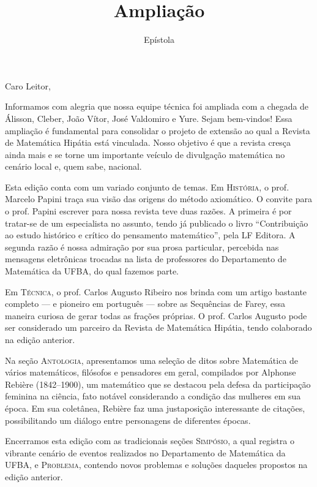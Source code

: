 \documentclass[onecolumn]{hipatia}
\title{Ampliação}
\subtitle{Epístola}
\author{}
\begin{document}
\setcounter{page}{\epistolapage}
\maketitle
\leftskip=2.5cm
\rightskip=2.5cm


\noindent Caro Leitor,
\vspace{1cm}


Informamos com alegria que nossa equipe técnica foi ampliada com a chegada de Álisson, Cleber, João Vítor, José Valdomiro e Yure. Sejam bem-vindos! Essa ampliação é fundamental para consolidar o projeto de extensão ao qual a Revista de Matemática Hipátia está vinculada. Nosso objetivo é que a revista cresça ainda mais e se torne um importante veículo de divulgação matemática no cenário local e, quem sabe, nacional.

Esta edição conta com um variado conjunto de temas. Em \textsc{História}, o prof. Marcelo Papini traça sua visão das origens do método axiomático. O convite para 
o prof. Papini escrever para nossa revista teve duas razões. A primeira é por
tratar-se de um especialista no assunto, tendo já publicado o livro ``Contribuição ao estudo histórico e crítico do pensamento matemático'', pela LF Editora.
A segunda razão é nossa admiração por sua prosa particular, 
percebida nas mensagens eletrônicas trocadas na lista de professores do Departamento
de Matemática da UFBA, do qual fazemos parte. 

Em \textsc{Técnica}, o prof. Carlos Augusto Ribeiro nos brinda com um 
artigo bastante completo --- e pioneiro em português --- sobre as Sequências de Farey, essa maneira 
curiosa de gerar todas as frações próprias. O prof. Carlos Augusto 
pode ser considerado um parceiro da Revista de Matemática Hipátia, tendo colaborado na edição anterior.

Na seção \textsc{Antologia}, apresentamos uma seleção de ditos 
sobre Matemática de vários matemáticos, filósofos e pensadores em geral, compilados por Alphonse Rebière (1842--1900), um matemático que 
se destacou pela defesa da participação feminina na ciência,
fato notável considerando a condição das mulheres em sua época. Em sua 
coletânea, Rebière faz uma 
justaposição interessante de citações, possibilitando um 
diálogo entre personagens de diferentes épocas.

Encerramos esta edição com as tradicionais seções \textsc{Simpósio},
a qual registra o vibrante cenário de eventos realizados no 
Departamento de Matemática da UFBA, e \textsc{Problema}, contendo
novos problemas e soluções daqueles propostos na edição anterior.
\end{document}
